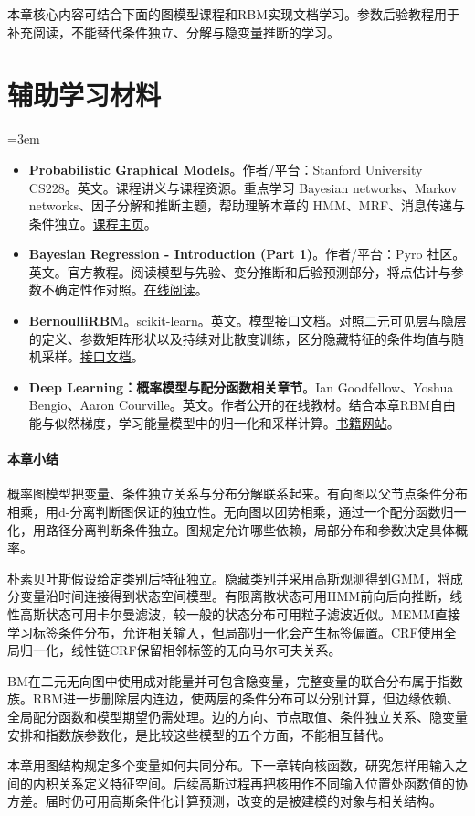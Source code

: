 本章核心内容可结合下面的图模型课程和RBM实现文档学习。参数后验教程用于补充阅读，不能替代条件独立、分解与隐变量推断的学习。
\section*{辅助学习材料}
\begingroup
\emergencystretch=3em
\begin{itemize}
\item \textbf{Probabilistic Graphical Models}。作者/平台：Stanford University CS228。英文。课程讲义与课程资源。重点学习 Bayesian networks、Markov networks、因子分解和推断主题，帮助理解本章的 HMM、MRF、消息传递与条件独立。\href{https://ermongroup.github.io/cs228/}{课程主页}。
\item \textbf{Bayesian Regression - Introduction (Part 1)}。作者/平台：Pyro 社区。英文。官方教程。阅读模型与先验、变分推断和后验预测部分，将点估计与参数不确定性作对照。\href{https://pyro.ai/examples/bayesian\_regression.html}{在线阅读}。
\item \textbf{BernoulliRBM}。scikit-learn。英文。模型接口文档。对照二元可见层与隐层的定义、参数矩阵形状以及持续对比散度训练，区分隐藏特征的条件均值与随机采样。\href{https://scikit-learn.org/stable/modules/generated/sklearn.neural\_network.BernoulliRBM.html}{接口文档}。
\item \textbf{Deep Learning：概率模型与配分函数相关章节}。Ian Goodfellow、Yoshua Bengio、Aaron Courville。英文。作者公开的在线教材。结合本章RBM自由能与似然梯度，学习能量模型中的归一化和采样计算。\href{https://www.deeplearningbook.org/}{书籍网站}。
\end{itemize}
\endgroup
\paragraph{本章小结}
概率图模型把变量、条件独立关系与分布分解联系起来。有向图以父节点条件分布相乘，用d-分离判断图保证的独立性。无向图以团势相乘，通过一个配分函数归一化，用路径分离判断条件独立。图规定允许哪些依赖，局部分布和参数决定具体概率。

朴素贝叶斯假设给定类别后特征独立。隐藏类别并采用高斯观测得到GMM，将成分变量沿时间连接得到状态空间模型。有限离散状态可用HMM前向后向推断，线性高斯状态可用卡尔曼滤波，较一般的状态分布可用粒子滤波近似。MEMM直接学习标签条件分布，允许相关输入，但局部归一化会产生标签偏置。CRF使用全局归一化，线性链CRF保留相邻标签的无向马尔可夫关系。

BM在二元无向图中使用成对能量并可包含隐变量，完整变量的联合分布属于指数族。RBM进一步删除层内连边，使两层的条件分布可以分别计算，但边缘依赖、全局配分函数和模型期望仍需处理。边的方向、节点取值、条件独立关系、隐变量安排和指数族参数化，是比较这些模型的五个方面，不能相互替代。

本章用图结构规定多个变量如何共同分布。下一章转向核函数，研究怎样用输入之间的内积关系定义特征空间。后续高斯过程再把核用作不同输入位置处函数值的协方差。届时仍可用高斯条件化计算预测，改变的是被建模的对象与相关结构。
